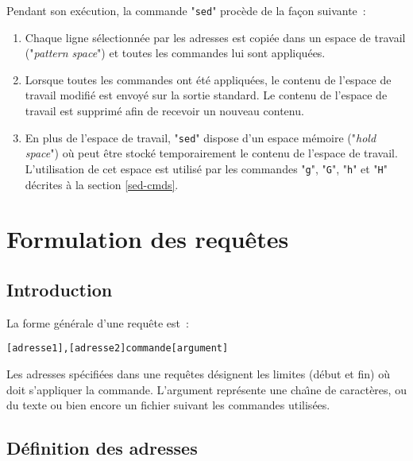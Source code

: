 Pendant son ex{\'e}cution, la commande "{\tt sed}" proc{\`e}de de la fa\c{c}on
suivante~:
\begin{enumerate}
	\item	Chaque ligne s{\'e}lectionn{\'e}e par les adresses est copi{\'e}e dans un
			espace de travail ("{\sl pattern space}") et toutes les
			commandes lui sont appliqu{\'e}es.
	\item	Lorsque toutes les commandes ont {\'e}t{\'e} appliqu{\'e}es, le contenu
			de l'espace de travail modifi{\'e} est envoy{\'e} sur la sortie
			standard. Le contenu de l'espace de travail est supprim{\'e} afin
			de recevoir un nouveau contenu.
	\item	En plus de l'espace de travail, "{\tt sed}" dispose d'un espace m{\'e}moire
			("{\sl hold space}") o{\`u} peut {\^e}tre stock{\'e} temporairement
			le contenu de l'espace de travail. L'utilisation de cet espace
			est utilis{\'e} par les commandes "{\tt g}", "{\tt G}",
			"{\tt h}" et "{\tt H}" d{\'e}crites {\`a} la section
			\ref{sed-cmds}.
\end{enumerate}

\section{Formulation des requ{\^e}tes}

\subsection{Introduction}

La forme g{\'e}n{\'e}rale d'une requ{\^e}te est~:
\begin{center}
\begin{verbatim}
[adresse1],[adresse2]commande[argument]
\end{verbatim}
\end{center}

Les adresses sp{\'e}cifi{\'e}es dans une requ{\^e}tes d{\'e}signent les limites
(d{\'e}but et fin) o{\`u} doit s'appliquer la  commande. L'argument repr{\'e}sente
une cha{\^\i}ne de caract{\`e}res, ou du texte ou bien encore un fichier suivant les 
commandes utilis{\'e}es.

\subsection{\label{sed-def-addr}D{\'e}finition des adresses}

